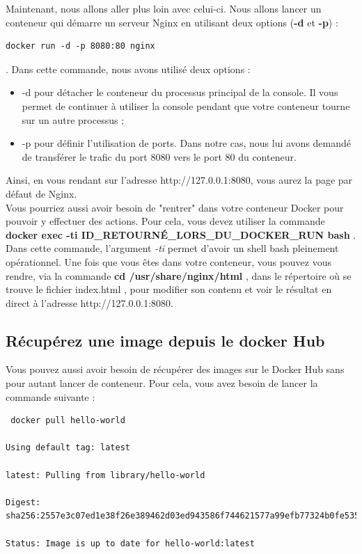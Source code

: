 \documentclass[12pt,a4paper]{article}
\begin{document}
Maintenant, nous allons aller plus loin avec celui-ci. Nous allons lancer un conteneur qui démarre un serveur Nginx en utilisant deux options (\textbf{-d} et \textbf{-p}) :
\begin{verbatim}
docker run -d -p 8080:80 nginx 
\end{verbatim}  .
Dans cette commande, nous avons utilisé deux options :
\begin{itemize}
\item -d pour détacher le conteneur du processus principal de la console. Il vous permet de continuer à utiliser la console pendant que votre conteneur tourne sur un autre processus ;
\item -p pour définir l'utilisation de ports. Dans notre cas, nous lui avons demandé de transférer le trafic du port 8080 vers le port 80 du conteneur.
\end{itemize}
    Ainsi, en vous rendant sur l'adresse  http://127.0.0.1:8080, vous aurez la page par défaut de Nginx.\\
Vous pourriez aussi avoir besoin de "rentrer" dans votre conteneur Docker pour pouvoir y effectuer des actions. Pour cela, vous devez utiliser la commande 
\textbf{docker exec -ti ID\_RETOURNÉ\_LORS\_DU\_DOCKER\_RUN bash}  . Dans cette commande, l'argument \textit{-ti} permet d'avoir un shell bash pleinement opérationnel. Une fois que vous êtes dans votre conteneur, vous pouvez vous rendre, via la commande \textbf{cd /usr/share/nginx/html}  , dans le répertoire où se trouve le fichier index.html  , pour modifier son contenu et voir le résultat en direct à l'adresse http://127.0.0.1:8080.

\subsection{Récupérez une image depuis le docker Hub}
Vous pouvez aussi avoir besoin de récupérer des images sur le Docker Hub sans pour autant lancer de conteneur. Pour cela, vous avez besoin de lancer la commande suivante :

\begin{verbatim}
 docker pull hello-world

Using default tag: latest

latest: Pulling from library/hello-world

Digest: sha256:2557e3c07ed1e38f26e389462d03ed943586f744621577a99efb77324b0fe535

Status: Image is up to date for hello-world:latest
\end{verbatim}
\end{document}
